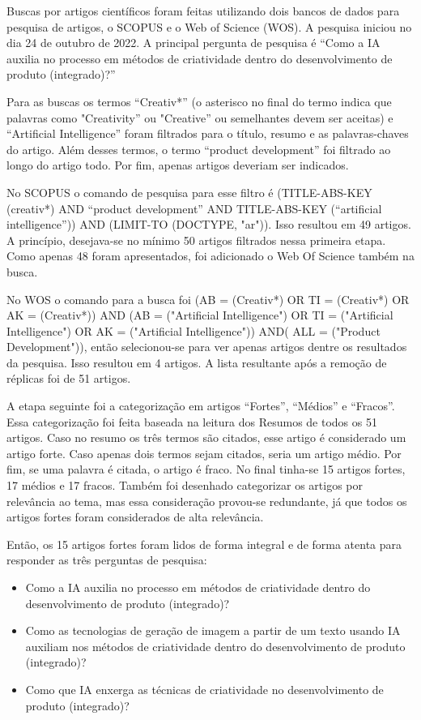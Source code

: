 Buscas por artigos científicos foram feitas utilizando dois bancos de dados para pesquisa de artigos, o SCOPUS e o Web of Science (WOS). A pesquisa iniciou no dia 24 de outubro de 2022. A principal pergunta de pesquisa é “Como a IA auxilia no processo em métodos de criatividade dentro do desenvolvimento de produto (integrado)?”

Para as buscas os termos “Creativ*” (o asterisco no final do termo indica que palavras como "Creativity” ou "Creative” ou semelhantes devem ser aceitas) e “Artificial Intelligence” foram filtrados para o título, resumo e as palavras-chaves do artigo. Além desses termos, o termo “product development” foi filtrado ao longo do artigo todo. Por fim, apenas artigos deveriam ser indicados. 

No SCOPUS o comando de pesquisa para esse filtro é (TITLE-ABS-KEY (creativ*) AND “product  development” AND TITLE-ABS-KEY (“artificial intelligence”)) AND (LIMIT-TO (DOCTYPE, "ar")). Isso resultou em 49 artigos. A princípio, desejava-se no mínimo 50 artigos filtrados nessa primeira etapa. Como apenas 48 foram apresentados, foi adicionado o Web Of Science também na busca.

No WOS o comando para a busca foi (AB = (Creativ*) OR TI = (Creativ*) OR AK = (Creativ*)) AND (AB = ("Artificial Intelligence") OR TI = ("Artificial Intelligence") OR AK = ("Artificial Intelligence")) AND( ALL = ("Product Development")), então selecionou-se para ver apenas artigos dentre os resultados da pesquisa. Isso resultou em 4 artigos. A lista resultante após a remoção de réplicas foi de 51 artigos. 

A etapa seguinte foi a categorização em artigos “Fortes”, “Médios” e “Fracos”. Essa categorização foi feita baseada na leitura dos Resumos de todos os 51 artigos. Caso no resumo os três termos são citados, esse artigo é considerado um artigo forte. Caso apenas dois termos sejam citados, seria um artigo médio. Por fim, se uma palavra é citada, o artigo é fraco. No final tinha-se 15 artigos fortes, 17 médios e 17 fracos. Também foi desenhado categorizar os artigos por relevância ao tema, mas essa consideração provou-se redundante, já que todos os artigos fortes foram considerados de alta relevância.

Então, os 15 artigos fortes foram lidos de forma integral e de forma atenta para responder as três perguntas de pesquisa: 

\begin{itemize}

    \item Como a IA auxilia no processo em métodos de criatividade dentro do desenvolvimento de produto (integrado)?

    \item Como as tecnologias  de geração de imagem a partir de um texto usando IA auxiliam nos métodos de criatividade dentro do desenvolvimento de produto (integrado)?

    \item Como que IA enxerga as técnicas de criatividade no desenvolvimento de produto (integrado)?
\end{itemize}

